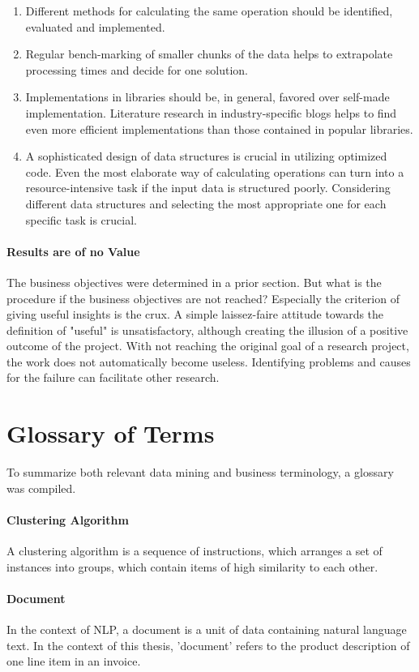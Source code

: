 \begin{enumerate}
	\item Different methods for calculating the same operation should be identified, evaluated and implemented.
	\item Regular bench-marking of smaller chunks of the data helps to extrapolate processing times and decide for one solution.
	\item Implementations in libraries should be, in general, favored over self-made implementation. Literature research in industry-specific blogs helps to find even more efficient implementations than those contained in popular libraries.
	\item A sophisticated design of data structures is crucial in utilizing optimized code. Even the most elaborate way of calculating operations can turn into a resource-intensive task if the input data is structured poorly. Considering different data structures and selecting the most appropriate one for each specific task is crucial.
\end{enumerate}

\paragraph{Results are of no Value}
The business objectives were determined in a prior section. But what is the procedure if the business objectives are not reached? Especially the criterion of giving useful insights is the crux.
A simple laissez-faire attitude towards the definition of "useful" is unsatisfactory, although creating the illusion of a positive outcome of the project.
With not reaching the original goal of a research project, the work does not automatically become useless. Identifying problems and causes for the failure can facilitate other research.

\section{Glossary of Terms}
To summarize both relevant data mining and business terminology, a glossary was compiled.

	\paragraph{Clustering Algorithm} A clustering algorithm is a sequence of instructions, which arranges a set of instances into groups, which contain items of high similarity to each other.
	\paragraph{Document} In the context of \ac{NLP}, a document is a unit of data containing natural language text. In the context of this thesis, 'document' refers to the product description of one line item in an invoice.
